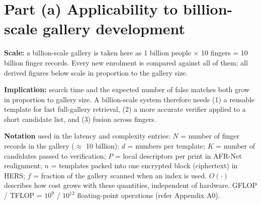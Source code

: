 \documentclass[10pt,a4paper]{article}
\begin{document}
\section*{Part (a) \textperiodcentered{} Applicability to billion-scale gallery development}
\textbf{Scale:} a billion-scale gallery is taken here as 1 billion people $\times$ 10 fingers = 10 billion finger records. Every new enrolment is compared against all of them; all derived figures below scale in proportion to the gallery size.

\textbf{Implication:} search time and the expected number of false matches both grow in proportion to gallery size. A billion-scale system therefore needs (1) a reusable template for fast full-gallery retrieval, (2) a more accurate verifier applied to a short candidate list, and (3) fusion across fingers.

\textbf{Notation} used in the latency and complexity entries: $N$ = number of finger records in the gallery ($\approx$ 10 billion); $d$ = numbers per template; $K$ = number of candidates passed to verification; $P$ = local descriptors per print in AFR-Net realignment; $n$ = templates packed into one encrypted block (ciphertext) in HERS; $f$ = fraction of the gallery scanned when an index is used. $O(\cdot)$ describes how cost grows with these quantities, independent of hardware. GFLOP / TFLOP = $10^9$ / $10^{12}$ floating-point operations (refer Appendix A0).
\end{document}
